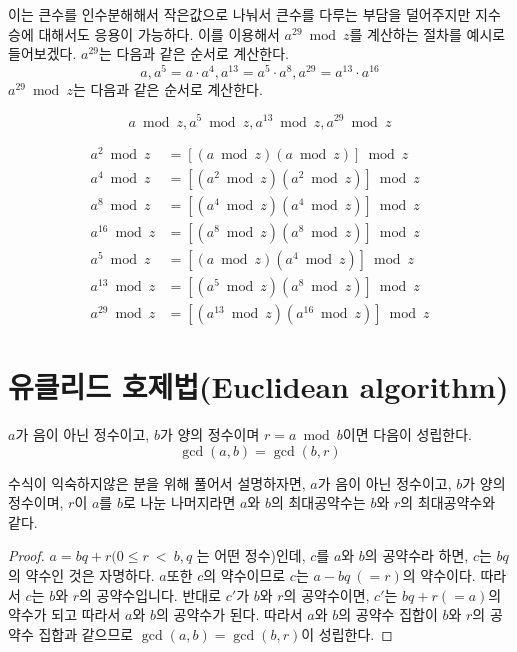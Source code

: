 이는 큰수를 인수분해해서 작은값으로 나눠서 큰수를 다루는 부담을 덜어주지만 지수승에 대해서도 응용이 가능하다.
이를 이용해서 $a^{29}\bmod z$를 계산하는 절차를 예시로 들어보겠다. $a^{29}$는 다음과 같은 순서로 계산한다.
   \[ a , a^{5}=a \cdot a^4, a^{13}=a^{5}\cdot a^{8}, a^{29}=a^{13}\cdot a^{16} \]
$a^{29} \bmod z$는 다음과 같은 순서로 계산한다.
    
\[a \bmod z , a^{5}\bmod z, a^{13}\bmod z, a^{29}\bmod z\]

\begin{align*}
    a^2 \bmod z & = [(a\bmod z)(a\bmod z)]\bmod z \\
    a^4 \bmod z & = [(a^2\bmod z)(a^2\bmod z)]\bmod z \\
    a^8 \bmod z & = [(a^4\bmod z)(a^4\bmod z)]\bmod z \\
    a^{16} \bmod z & = [(a^8 \bmod z)(a^8\bmod z)]\bmod z \\
    a^5 \bmod z & = [(a \bmod z)(a^4\bmod z)]\bmod z \\
    a^{13} \bmod z & = [(a^5\bmod z)(a^8\bmod z)]\bmod z \\ 
    a^{29} \bmod z & = [(a^{13}\bmod z)(a^{16}\bmod z)]\bmod z
\end{align*}



\section{유클리드 호제법(Euclidean algorithm)}
\begin{justbox}
    \begin{theorem}
        $a$가 음이 아닌 정수이고, $b$가 양의 정수이며 $r=a \bmod b$이면 다음이 성립한다.
\[ \gcd(a,b) = \gcd(b,r) \]  
    \end{theorem}
\end{justbox}
수식이 익숙하지않은 분을 위해 풀어서 설명하자면,
$a$가 음이 아닌 정수이고, $b$가 양의 정수이며, $r$이 $a$를 $b$로 나눈 나머지라면 $a$와 $b$의 최대공약수는 $b$와 $r$의 최대공약수와 같다.
\begin{proof}
$a=bq +r (0 \le r\: <\: b , q$ 는 어떤 정수)인데, $c$를 $a$와  $b$의 공약수라 하면, $c$는 $bq$의 약수인 것은 자명하다.
$a$또한 $c$의 약수이므로 $c$는 $a-bq\:(=r)$의 약수이다. 
따라서 $c$는 $b$와 $r$의 공약수입니다. 반대로 $c'$가 $b$와 $r$의 공약수이면, $c'$는 $bq+r(=a)$의 약수가 되고 따라서 $a$와 $b$의 공약수가 된다. 
따라서 $a$와 $b$의 공약수 집합이 $b$와 $r$의 공약수 집합과 같으므로 $\gcd(a,b) = \gcd(b,r)$이 성립한다.
\end{proof}

